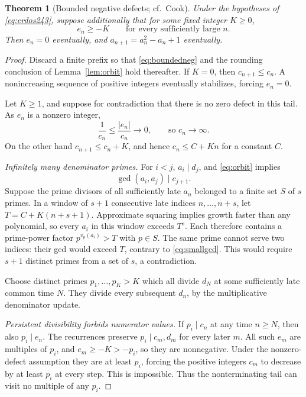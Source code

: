 \documentclass[11pt,a4paper]{article}
\newtheorem{theorem}{Theorem}[section]
\theoremstyle{definition}
\theoremstyle{remark}\newtheorem{remark}[theorem]{Remark}
\begin{document}
\begin{theorem}[Bounded negative defects; cf.\ Cook]\label{thm:CRT}
Under the hypotheses of \eqref{eq:erdos243}, suppose additionally
that for some fixed integer $K\ge0$,
\begin{equation}\label{eq:boundedneg}
 e_n\ge-K\qquad\text{for every sufficiently large }n.
\end{equation}
Then $e_n=0$ eventually, and
$a_{n+1}=a_n^2-a_n+1$ eventually.
\end{theorem}
\begin{proof}
Discard a finite prefix so that \eqref{eq:boundedneg} and the
rounding conclusion of Lemma~\ref{lem:orbit} hold thereafter.
If $K=0$, then $c_{n+1}\le c_n$. A nonincreasing sequence of positive
integers eventually stabilizes, forcing $e_n=0$.

Let $K\ge1$, and suppose for contradiction that there is no zero
defect in this tail. As $e_n$ is a nonzero integer,
\begin{equation}\label{eq:cdiverges}
 \frac1{c_n}\le\frac{|e_n|}{c_n}\longrightarrow0,
 \qquad\text{so }c_n\longrightarrow\infty.
\end{equation}
On the other hand $c_{n+1}\le c_n+K$, and hence $c_n\le C+Kn$
for a constant $C$.

\emph{Infinitely many denominator primes.}
For $i<j$, $a_i\mid d_j$, and \eqref{eq:orbit} implies
\begin{equation}\label{eq:smallgcd}
 \gcd(a_i,a_j)\mid c_{j+1}.
\end{equation}
Suppose the prime divisors of all sufficiently late $a_n$ belonged
to a finite set $S$ of $s$ primes. In a window of $s+1$ consecutive
late indices $n,\ldots,n+s$, let $T=C+K(n+s+1)$. Approximate
squaring implies growth faster than any polynomial, so every
$a_i$ in this window exceeds $T^s$. Each therefore contains a
prime-power factor $p^{v_p(a_i)}>T$ with $p\in S$. The same prime
cannot serve two indices: their gcd would exceed $T$, contrary
to \eqref{eq:smallgcd}. This would require $s+1$ distinct primes
from a set of $s$, a contradiction.

Choose distinct primes $p_1,\ldots,p_K>K$ which all divide $d_N$
at some sufficiently late common time $N$. They divide every
subsequent $d_n$, by the multiplicative denominator update.

\emph{Persistent divisibility forbids numerator values.}
If $p_i\mid c_n$ at any time $n\ge N$, then also $p_i\mid e_n$.
The recurrences preserve $p_i\mid c_m,d_m$ for every later $m$.
All such $e_m$ are multiples of $p_i$, and $e_m\ge-K>-p_i$,
so they are nonnegative. Under the nonzero-defect assumption
they are at least $p_i$, forcing the positive integers $c_m$
to decrease by at least $p_i$ at every step. This is impossible.
Thus the nonterminating tail can visit no multiple of any $p_i$.


\end{proof}
\end{document}
